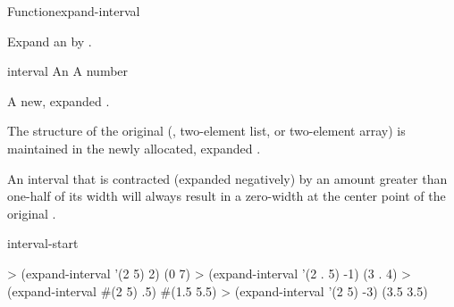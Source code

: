 \documentclass[10pt,twoside,english,pdftex]{article}
\begin{document}
\begin{functiondoc}{Function}{expand-interval}%
  { \returns{} }
%
%

\fnsyntax

\fnpurpose Expand an  by .

\fnpackage {}

\fnmodule {}

\fnargs
\begin{args}{interval}
\arg[interval] An 
\arg[amount] A number
\end{args}

\fnreturns A new, expanded .

\fndescription The structure of the original 
(, two-element list, or two-element array) is maintained in the
newly allocated, expanded .

An interval that is contracted (expanded negatively) by an amount
greater than one-half of its width will always result in a zero-width
 at the center point of the original .

\begin{alsos}{interval-start}
\end{alsos}

\fnexamples
\begin{example}
> (expand-interval '(2 5) 2)
(0 7)
> (expand-interval '(2 . 5) -1)
(3 . 4)
> (expand-interval #(2 5) .5)
#(1.5 5.5)
> (expand-interval '(2 5) -3)
(3.5 3.5)
\end{example}

\end{functiondoc}

\end{document}
